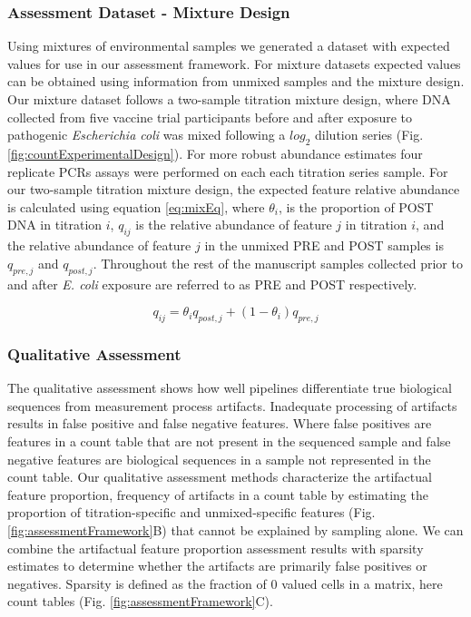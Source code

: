 \documentclass{bmcart}
\begin{document}
\subsubsection*{Assessment Dataset - Mixture Design}

Using mixtures of environmental samples we generated a dataset with expected values for use in our assessment framework. 
For mixture datasets expected values can be obtained using information from unmixed samples and the mixture design.
Our mixture dataset follows a two-sample titration mixture design, where DNA collected from five vaccine trial participants before and
after exposure to pathogenic \emph{Escherichia coli} was mixed following a \(log_2\) dilution series (Fig. \ref{fig:countExperimentalDesign}).
For more robust abundance estimates four replicate PCRs assays were performed on each each titration series sample.
For our two-sample titration mixture design, the expected feature
relative abundance is calculated using equation \eqref{eq:mixEq},
where \(\theta_i\), is the proportion of POST DNA in titration \(i\),
\(q_{ij}\) is the relative abundance of feature \(j\) in titration
\(i\), and the relative abundance of feature \(j\) in the unmixed PRE
and POST samples is \(q_{pre,j}\) and \(q_{post,j}\).
Throughout the rest of the manuscript samples collected prior to and after \emph{E. coli} exposure are referred to as PRE and POST respectively.

\begin{equation}
  q_{ij} = \theta_i q_{post,j} + (1 - \theta_i) q_{pre,j}
  \label{eq:mixEq}
\end{equation}

\subsubsection*{Qualitative Assessment}
The qualitative assessment shows how well pipelines differentiate true biological sequences from measurement process artifacts.
Inadequate processing of artifacts results in false positive and false negative features.
Where false positives are features in a count table that are not present in the sequenced sample and false negative features are biological sequences in a sample not represented in the count table.
Our qualitative assessment methods characterize the artifactual feature proportion, frequency of artifacts in a count table by estimating the proportion of titration-specific and unmixed-specific features (Fig. \ref{fig:assessmentFramework}B) that cannot be explained by sampling alone.
We can combine the artifactual feature proportion assessment results with sparsity estimates to determine whether the artifacts are primarily false positives or negatives.
Sparsity is defined as the fraction of 0 valued cells in a matrix, here count tables (Fig. \ref{fig:assessmentFramework}C).
\end{document}
